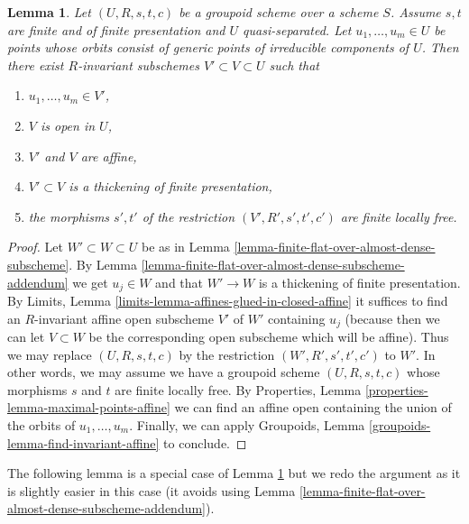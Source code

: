 \documentclass{stacks-project}
\theoremstyle{plain}
\newtheorem{lemma}[subsection]{Lemma}
\theoremstyle{definition}
\theoremstyle{remark}
\numberwithin{equation}{subsection}
\begin{document}
\begin{lemma}
\label{lemma-invariant-affine-open-around-generic-point}
Let $(U, R, s, t, c)$ be a groupoid scheme over a scheme $S$. Assume $s, t$
are finite and of finite presentation and $U$ quasi-separated. Let
$u_1, \ldots, u_m \in U$ be points whose orbits consist of generic points
of irreducible components of $U$. Then there exist $R$-invariant subschemes
$V' \subset V \subset U$ such that
\begin{enumerate}
\item $u_1, \ldots, u_m \in V'$,
\item $V$ is open in $U$,
\item $V'$ and $V$ are affine,
\item $V' \subset V$ is a thickening of finite presentation,
\item the morphisms $s', t'$ of the restriction $(V', R', s', t', c')$
are finite locally free.
\end{enumerate}
\end{lemma}

\begin{proof}
Let $W' \subset W \subset U$ be as in
Lemma \ref{lemma-finite-flat-over-almost-dense-subscheme}.
By Lemma \ref{lemma-finite-flat-over-almost-dense-subscheme-addendum}
we get $u_j \in W$ and that $W' \to W$ is a thickening of finite presentation.
By Limits, Lemma \ref{limits-lemma-affines-glued-in-closed-affine}
it suffices to find an $R$-invariant affine open subscheme
$V'$ of $W'$ containing $u_j$ (because then we can let $V \subset W$
be the corresponding open subscheme which will be affine).
Thus we may replace $(U, R, s, t, c)$ by the restriction
$(W', R', s', t', c')$ to $W'$.
In other words, we may assume we have a groupoid scheme $(U, R, s, t, c)$
whose morphisms $s$ and $t$ are finite locally free.
By Properties, Lemma \ref{properties-lemma-maximal-points-affine}
we can find an affine open containing the union of the orbits of
$u_1, \ldots, u_m$. Finally, we can apply
Groupoids, Lemma \ref{groupoids-lemma-find-invariant-affine}
to conclude.
\end{proof}

\noindent
The following lemma is a special case of
Lemma \ref{lemma-invariant-affine-open-around-generic-point}
but we redo the argument as it is slightly easier in this case
(it avoids using
Lemma \ref{lemma-finite-flat-over-almost-dense-subscheme-addendum}).
\end{document}
